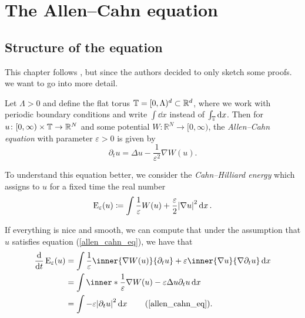 \chapter{The Allen--Cahn equation}

\section{Structure of the equation}

This chapter follows \cite{convergence_of_allen_cahn_equation_to_multiphase_mean_curvature_flow}, but since the authors decided to only sketch some proofs. we want to go into more detail.

Let $ \Lambda > 0 $ and define the flat torus 
$ \operatorname{\mathbb{T}} = [0, \Lambda )^{ d } \subset \mathbb{ R }^{ d } $, 
where we work with periodic boundary conditions and write $ \int \dd{x} $ instead of $ \int_{ \operatorname{\mathbb{T}} } \dd{x} $.
Then for 
$ u \colon [ 0 , \infty ) \times \operatorname{\mathbb{T}} \to \mathbb{ R }^{ N } $ 
and some potential 
$ W \colon \mathbb{ R }^{ N } \to [0, \infty ) $,
the \emph{Allen--Cahn equation} with parameter $ \varepsilon > 0 $ is given by
\begin{equation}
	\label{allen_cahn_eq}
	\partial_{ t } u 
	=
	\Delta u - \frac{1 }{ \varepsilon^{ 2 } } \nabla W ( u ).
\end{equation}

To understand this equation better, we consider the \emph{Cahn--Hilliard energy} which assigns to $ u $ for a fixed time the real number
\begin{equation}
	\label{cahn_hilliard_energy}
	\operatorname{E}_{ \varepsilon } 
		(u)
	\coloneqq
	\int
		\frac{ 1 }{ \varepsilon }
		W ( u )
		+
		\frac{ \varepsilon }{ 2 }
		\abs{ \nabla u }^{ 2 }
	\dd{x}.
\end{equation}

If everything is nice and smooth, we can compute that under the assumption that $ u $ satisfies 
equation (\ref{allen_cahn_eq}), we have that
\begin{align*}
	\dv{t} \energy_{ \varepsilon } ( u )
	&=
	\int
		\frac{ 1 }{ \varepsilon }
		\inner{\nabla W ( u )}{ \partial_{ t } u}
		+
		\varepsilon
		\inner{\nabla u}{ \nabla \partial_{ t } u}
	\dd{x}
	\\
	&=
	\int
		\inner*{ \frac{ 1 }{\varepsilon } \nabla W ( u ) - \varepsilon \Delta u  }{ \partial_{ t } u }
	\dd{x}
	\\
	&=
	\int - \varepsilon \abs{ \partial_{ t } u }^{ 2 } \dd{ x }
	\tag{\ref{allen_cahn_eq}}.
\end{align*}

